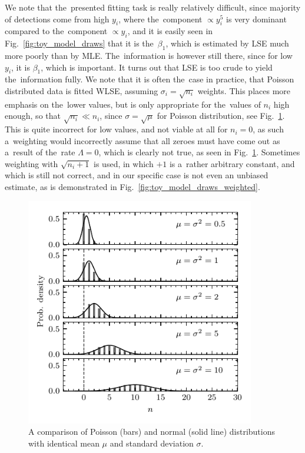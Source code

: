 We note that the~presented fitting task is really relatively difficult, since majority of detections come from high $y_i$, where the~component $\propto y_i^5$ is very dominant compared to the~component $\propto y_i$, and it is easily seen in Fig.~\ref{fig:toy_model_draws} that it is the~$\beta_1$, which is estimated by LSE much more poorly than by MLE. The~information is however still there, since for low $y_i$, it is $\beta_1$, which is important. It turns out that LSE is too crude to yield the~information fully. We note that it is often the~case in practice, that Poisson distributed data is fitted WLSE, assuming $\sigma_i = \sqrt{n_i}$ weights. This places more emphasis on the~lower values, but is only appropriate for the~values of $n_i$ high enough, so that $\sqrt{n_i} \ll n_i$, since $\sigma = \sqrt{\mu}$ for Poisson distribution, see Fig.~\ref{fig:pois_vs_norm}. This is quite incorrect for low values, and not viable at all for $n_i = 0$, as such a~weighting would incorrectly assume that all zeroes must have come out as a~result of the~rate $\Lambda = 0$, which is clearly not true, as seen in Fig.~\ref{fig:pois_vs_norm}. Sometimes weighting with $\sqrt{n_i+1}$ is used, in which $+1$ is a~rather arbitrary constant, and which is still not correct, and in our specific case is not even an unbiased estimate, as is demonstrated in Fig.~\ref{fig:toy_model_draws_weighted}. 

\begin{figure}[ht]
 	\centering
 	\includegraphics[width=10cm]{figures/pois_vs_norm.pdf}
 	\caption{A comparison of Poisson (bars) and normal (solid line) distributions with identical mean $\mu$ and standard deviation $\sigma$.}
 	\label{fig:pois_vs_norm}
\end{figure}

